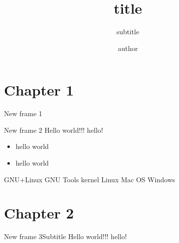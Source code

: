 \documentclass[gruvbox,Frankfurt,12pt]{darkbeamer}
\author{author}
\title{title}
\subtitle{subtitle}
\institute{My University}
\begin{document}
\section{Chapter 1}
\begin{frame}{New frame 1}
	\titlepage
\end{frame}

\begin{frame}{New frame 2}
	Hello world!!! \alert{hello!}
	\begin{itemize}
		\item hello world
		\item hello world
	\end{itemize}
	\begin{outline}
		\1 GNU+Linux
			\2 GNU Tools
			\2 kernel Linux
		\1 Mac OS
		\1 Windows
	\end{outline}

\end{frame}

\section{Chapter 2}
\begin{frame}{New frame 3}{Subtitle}
	Hello world!!! \alert{hello!}
\end{frame}
\end{document}
